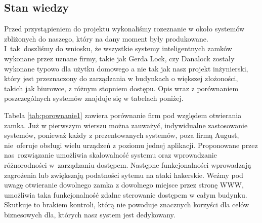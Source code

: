 \newpage
\subsection{Stan wiedzy}\label{sec:Stan wiedzy}
Przed przystąpieniem do projektu wykonaliśmy rozeznanie w około systemów zbliżonych do naszego, który na dany moment były produkowane. I~tak~doszliśmy do wniosku, że wszystkie systemy inteligentnych zamków wykonane przez uznane firmy, takie jak Gerda Lock, czy Danalock zostały wykonane typowo dla użytku domowego a nie tak jak nasz projekt inżynierski, który jest przeznaczony do zarządzania w budynkach o większej złożoności, takich jak biurowce, z różnym stopniem dostępu. Opis wraz z porównaniem poszczególnych systemów znajduje się w tabelach poniżej.

Tabela \ref{tab:porownanie1} zawiera porównanie firm pod względem otwierania zamka. Już w pierwszym wierszu można zauważyć, indywidualne zastosowanie systemów, ponieważ każdy z prezentowanych systemów, poza firmą August, nie~oferuje obsługi wielu urządzeń z poziomu jednej aplikacji. Proponowane przez nas~rozwiązanie umożliwia skalowalność systemu oraz wprowadzanie różnorodności w~zarządzaniu dostępem. Następne funkcjonalności wprowadzają zagrożenia lub zwiększają podatności sytemu na ataki hakerskie. Weźmy pod uwagę otwieranie dowolnego zamka z dowolnego miejsce przez stronę WWW, umożliwia taka funkcjonalność zdalne sterowanie dostępem w całym budynku. Skutkuje to brakiem kontroli, którą nie powoduje znacznych korzyści dla celów biznesowych dla, których nasz system jest dedykowany.
